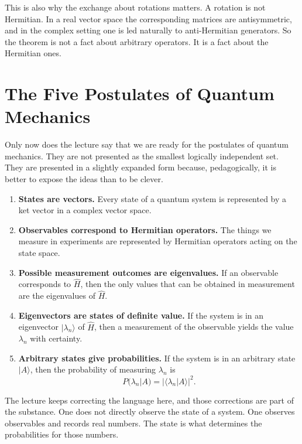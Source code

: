 This is also why the exchange about rotations matters. A rotation is not Hermitian. In a real vector space the corresponding matrices are antisymmetric, and in the complex setting one is led naturally to anti-Hermitian generators. So the theorem is not a fact about arbitrary operators. It is a fact about the Hermitian ones.

\section{The Five Postulates of Quantum Mechanics}

Only now does the lecture say that we are ready for the postulates of quantum mechanics. They are not presented as the smallest logically independent set. They are presented in a slightly expanded form because, pedagogically, it is better to expose the ideas than to be clever.

\begin{enumerate}
\item \textbf{States are vectors.} Every state of a quantum system is represented by a ket vector in a complex vector space.

\item \textbf{Observables correspond to Hermitian operators.} The things we measure in experiments are represented by Hermitian operators acting on the state space.

\item \textbf{Possible measurement outcomes are eigenvalues.} If an observable corresponds to \(\hat H\), then the only values that can be obtained in measurement are the eigenvalues of \(\hat H\).

\item \textbf{Eigenvectors are states of definite value.} If the system is in an eigenvector \(|\lambda_n\rangle\) of \(\hat H\), then a measurement of the observable yields the value \(\lambda_n\) with certainty.

\item \textbf{Arbitrary states give probabilities.} If the system is in an arbitrary state \(|A\rangle\), then the probability of measuring \(\lambda_n\) is
\begin{equation}
P(\lambda_n|A)=|\langle \lambda_n|A\rangle|^2.
\end{equation}
\end{enumerate}

The lecture keeps correcting the language here, and those corrections are part of the substance. One does not directly observe the state of a system. One observes observables and records real numbers. The state is what determines the probabilities for those numbers.

